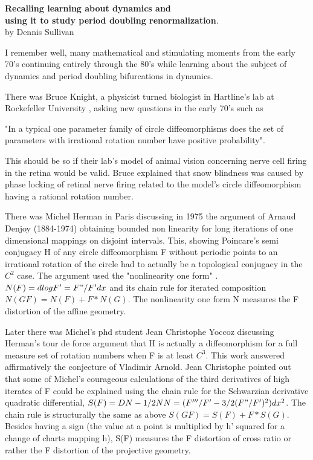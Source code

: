 \begin{description}
\bigskip

\textbf{Recalling learning about dynamics and\\
        using it to study period doubling renormalization}.
\\                          by  Dennis Sullivan

\medskip

I remember well, many mathematical  and  stimulating moments  from the
early 70's  continuing  entirely through the 80's while learning about
the subject of dynamics and period doubling bifurcations  in dynamics.

There was Bruce Knight, a physicist turned biologist in Hartline's  lab
at Rockefeller University , asking new questions  in the  early 70's
such as

"In a  typical one parameter family of  circle diffeomorphisms  does the
set of parameters with irrational rotation number have positive
probability".

This should be so if their lab's  model of animal vision  concerning
nerve cell firing in the retina  would be valid. Bruce explained that
snow blindness was caused by phase locking  of retinal nerve firing
related to the  model's circle diffeomorphism having a rational rotation
number.

There was Michel Herman in Paris  discussing in 1975 the argument of
Arnaud Denjoy (1884-1974)  obtaining   bounded non linearity  for long
iterations of  one dimensional mappings on disjoint intervals. This,
showing  Poincare's  semi conjugacy  H  of any circle  diffeomorphism F
without periodic points to an irrational rotation of the circle had to
actually be a  topological conjugacy in the $C^2$ case. The argument used
the "nonlinearity one form" . $N(F) =  d logF' =  F"/F'dx$ and its chain
rule  for iterated composition  $N(GF) =  N(F) + F*N(G)$.   The
nonlinearity one form N measures the  F distortion of the affine
geometry.


Later there was  Michel's  phd student Jean Christophe Yoccoz discussing
Herman's  tour de force argument that H is actually a diffeomorphism  for
a full measure set of rotation numbers   when  F  is at least $C^3$. This
work answered affirmatively the  conjecture of Vladimir Arnold. Jean
Christophe  pointed out  that some of  Michel's   courageous
calculations of the third derivatives of high iterates of F  could be
explained  using the chain rule for the  Schwarzian derivative quadratic
differential,
$S(F)= DN -1/2 NN = (F'''/F' - 3/2 (F"/F')^2) dx^2$.
The chain rule  is  structurally the same as above $S(GF) = S(F) + F*S(G)$.  Besides having a sign (the value at a point is multiplied by h' squared for a change of charts mapping h), S(F) measures the F distortion of cross ratio  or rather the F distortion of the  projective geometry.


\end{description}
